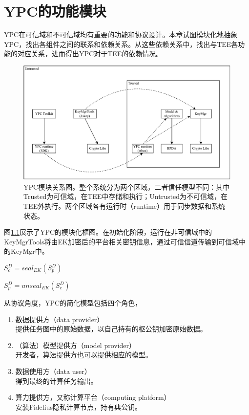 \chapter{YPC的功能模块}

YPC在可信域和不可信域均有重要的功能和协议设计。本章试图模块化地抽象YPC，找出各组件之间的联系和依赖关系。从这些依赖关系中，找出与TEE各功能的对应关系，进而得出YPC对于TEE的依赖情况。

\begin{figure}
    \centering
    \includegraphics[width=140mm]{figure/ypc-modular.pdf}
    \caption{YPC模块关系图。整个系统分为两个区域，二者信任模型不同：其中Trusted为可信域，在TEE中存储和执行；Untrusted为不可信域，在TEE外执行。两个区域各有运行时（runtime）用于同步数据和系统状态。}
    \label{fig:ypc-modular}
\end{figure}

图\ref{fig:ypc-modular}展示了YPC的模块化框图。在初始化阶段，运行在非可信域中的KeyMgrTools将由EK加密后的平台相关密钥信息，通过可信信道传输到可信域中的KeyMgr中。

$S^D_c = seal_{EK}(S^D_p)$

$S^D_p = unseal_{EK}(S^D_c)$

从协议角度，YPC的简化模型包括四个角色，
\begin{enumerate}
    \item 数据提供方（data provider）\\ 
    提供任务图中的原始数据，以自己持有的枢公钥加密原始数据。
    \item （算法）模型提供方（model provider）\\ 
    开发者，算法提供方也可以提供相应的模型。
    \item 数据使用方（data user）\\ 
    得到最终的计算任务输出。
    \item 算力提供方，又称计算平台（computing platform）\\ 
    安装Fidelius隐私计算节点，持有典公钥。
\end{enumerate}

